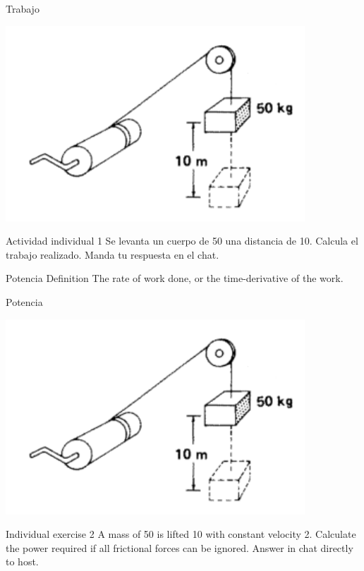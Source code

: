 \documentclass[presentation,aspectratio=169]{beamer}
\begin{document}
\begin{frame}[label={sec:org5d0666f}]{Trabajo}
\begin{center}
\includegraphics[height=0.6\textheight]{../../figures/pulley-block-50kg.png}
\end{center}

\alert{Actividad individual 1} Se levanta un cuerpo de \unit{50}{\kilogram} una distancia de \unit{10}{\meter}. Calcula el trabajo realizado. Manda tu respuesta en el chat.
\end{frame}



\begin{frame}[label={sec:org6c03b17}]{Potencia}
\alert{Definition} The rate of work done, or the time-derivative of the work.
\end{frame}

\begin{frame}[label={sec:org8aad4e3}]{Potencia}
\begin{center}
\includegraphics[height=0.6\textheight]{../../figures/pulley-block-50kg.png}
\end{center}

\alert{Individual exercise 2} A mass of \unit{50}{\kilogram} is lifted \unit{10}{\meter} with constant velocity \unit{2}{\meter\per\second}. Calculate the power required if all frictional forces can be ignored. Answer in chat directly to host.
\end{frame}
\end{document}
